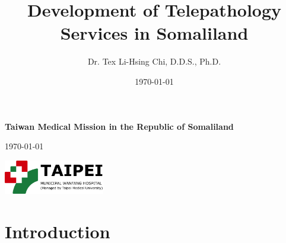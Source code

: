 \documentclass{article}
\title{Development of Telepathology Services in Somaliland}
\author{Dr. Tex Li-Hsing Chi, D.D.S., Ph.D.}
\date{\today}
\begin{document}
\begin{titlepage}

\hspace*{-0.7cm}%
\begin{tikzpicture} %


\hspace{1.4cm}
%

\end{tikzpicture}
    \vspace{2cm}
    
\centering
    {\Huge\bfseries Taiwan Medical Mission in the Republic of Somaliland \\
    \par } %
    \vspace{1.5cm}
    {\Large \today \par}


\vspace{2.0cm}
%
\includegraphics[height=1.5cm]{TMWH_logo_TAIPEI_vector.pdf}
\\
\vspace{1cm}



\end{titlepage}



\maketitle

\section{Introduction}
\end{document}
